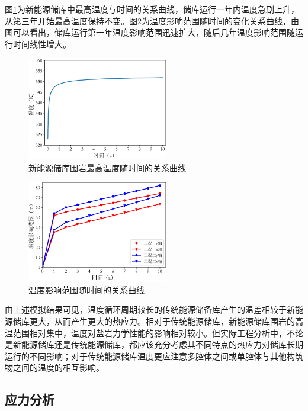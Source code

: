 图\ref{fig:5_33}为新能源储库中最高温度与时间的关系曲线，储库运行一年内温度急剧上升，从第三年开始最高温度保持不变。图\ref{fig:5_35}为温度影响范围随时间的变化关系曲线，由图可以看出，储库运行第一年温度影响范围迅速扩大，随后几年温度影响范围随运行时间线性增大。

\begin{figure}[ht!]
    \centering
    \includegraphics[width=0.55\textwidth]{img/chap5/温度/新能源储库最高温度与时间的关系.pdf}
    \caption{新能源储库围岩最高温度随时间的关系曲线}
    \label{fig:5_33}
\end{figure}

\begin{figure}[ht!]
    \centering
    \includegraphics[width=0.55\textwidth]{img/chap5/温度/温度影响范围随时间的关系曲线.pdf}
    \caption{温度影响范围随时间的关系曲线}
    \label{fig:5_35}
\end{figure}

由上述模拟结果可见，温度循环周期较长的传统能源储备库产生的温差相较于新能源储库更大，从而产生更大的热应力。相对于传统能源储库，新能源储库围岩的高温范围相对集中，温度对盐岩力学性能的影响相对较小。但实际工程分析中，不论是新能源储库还是传统能源储库，都应该充分考虑其不同特点的热应力对储库长期运行的不同影响；对于传统能源储库温度更应注意多腔体之间或单腔体与其他构筑物之间的温度的相互影响。

\subsection{应力分析}


